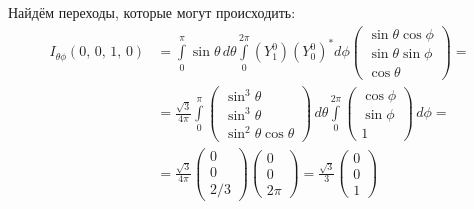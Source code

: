 Найдём переходы, которые могут происходить:
\begin{align*}
    I_{\theta\phi}(0,\,0,\,1,\,0) &= \int\limits_{0}^{\pi}\sin\theta\,d\theta\int\limits_{0}^{2\pi}(Y^0_1)(Y^0_0)^* d\phi \begin{pmatrix} \sin\theta\cos\phi \\ \sin\theta\sin\phi \\ \cos\theta \end{pmatrix} = \\
    & = \frac{\sqrt{3}}{4\pi}\int\limits_{0}^{\pi} \begin{pmatrix} \sin^3\theta\\ \sin^3 \theta \\ \sin^2\theta\cos\theta \end{pmatrix} \, d\theta \int\limits_{0}^{2\pi} \begin{pmatrix} \cos\phi \\ \sin\phi \\ 1 \end{pmatrix} \, d\phi = \\
    & = \frac{\sqrt{3}}{4\pi}\begin{pmatrix} 0 \\  0 \\ 2/3 \end{pmatrix} \begin{pmatrix} 0 \\  0 \\ 2\pi \end{pmatrix} = \frac{\sqrt{3}}{3}\begin{pmatrix} 0 \\  0 \\ 1 \end{pmatrix}
\end{align*}
